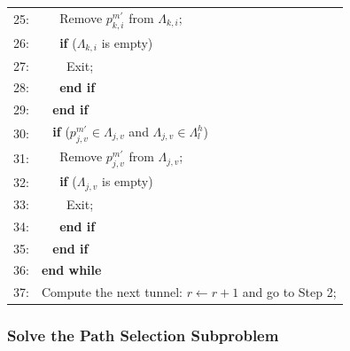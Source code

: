 \documentclass[12pt,onecolumn,draftclsnofoot]{IEEEtran} %
\begin{document}
\begin{table}[!t]
\begin{center}
\begin{tabular}{ll}
25: & $\;\;\;\;$ Remove $p_{k,i}^{m'}$ from $\Lambda_{k,i}$; \\
26: & $\;\;\;\;$ {\bf if} ($\Lambda_{k,i}$ is empty) \\
27: & $\;\;\;\;\;\;$ Exit; \\
28: & $\;\;\;\;$ {\bf end if} \\
29: & $\;\;$ {\bf end if} \\
30: & $\;\;$ {\bf if} ($p_{j,v}^{m'} \in \Lambda_{j,v}$ and $\Lambda_{j,v} \in \Lambda_l^h$) \\
31: & $\;\;\;\;$ Remove $p_{j,v}^{m'}$ from $\Lambda_{j,v}$; \\
32: & $\;\;\;\;$ {\bf if} ($\Lambda_{j,v}$ is empty) \\
33: & $\;\;\;\;\;\;$ Exit; \\
34: & $\;\;\;\;$ {\bf end if} \\
35: & $\;\;$ {\bf end if} \\
36: & {\bf end while} \\
37: & Compute the next tunnel: $r \leftarrow r+1$ and go to Step 2; \\
\hline
\end{tabular}
\label{tab:ChanSchedAlgo}
\end{center}
\end{table}


\subsubsection{Solve the Path Selection Subproblem} 
\end{document}
